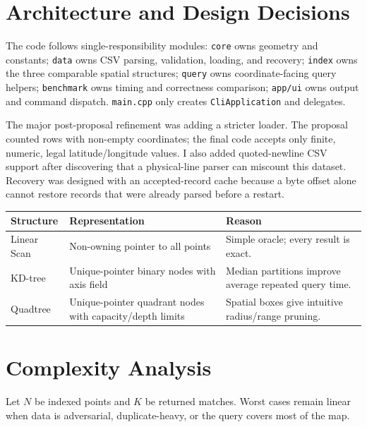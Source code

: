 \documentclass[12pt]{article}
\begin{document}
\section{Architecture and Design Decisions}
The code follows single-responsibility modules: \texttt{core} owns geometry and
constants; \texttt{data} owns CSV parsing, validation, loading, and recovery;
\texttt{index} owns the three comparable spatial structures; \texttt{query}
owns coordinate-facing query helpers; \texttt{benchmark} owns timing and
correctness comparison; \texttt{app/ui} owns output and command dispatch.
\texttt{main.cpp} only creates \texttt{CliApplication} and delegates.

The major post-proposal refinement was adding a stricter loader. The proposal
counted rows with non-empty coordinates; the final code accepts only finite,
numeric, legal latitude/longitude values. I also added quoted-newline CSV
support after discovering that a physical-line parser can miscount this dataset.
Recovery was designed with an accepted-record cache because a byte offset alone
cannot restore records that were already parsed before a restart.

\begin{center}
\begin{tabular}{L{1.3in}L{2.1in}L{2.0in}}
\toprule
Structure & Representation & Reason \\
\midrule
Linear Scan & Non-owning pointer to all points & Simple oracle; every result is exact.\\
KD-tree & Unique-pointer binary nodes with axis field & Median partitions improve average repeated query time.\\
Quadtree & Unique-pointer quadrant nodes with capacity/depth limits & Spatial boxes give intuitive radius/range pruning.\\
\bottomrule
\end{tabular}
\normalsize
\end{center}

\section{Complexity Analysis}
Let $N$ be indexed points and $K$ be returned matches. Worst cases remain
linear when data is adversarial, duplicate-heavy, or the query covers most of the
map.
\end{document}

